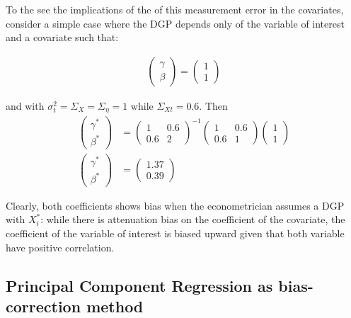 \documentclass[12pt]{article}
\begin{document}
To the see the implications of the of this measurement error in the covariates, consider a simple case where the DGP depends only of the variable of interest and a covariate such that:

\begin{align}
    \left(\begin{array}{l}
{\gamma} \\
{\beta}
\end{array}\right)=\left(\begin{array}{l}
1 \\
1
\end{array}\right)
\end{align}

and with $\sigma^2_t=\Sigma_X=\Sigma_\eta=1$ while $\Sigma_{Xt}=0.6$. Then
\begin{align*}
    \left(\begin{array}{l}
{\gamma}^* \\
{\beta}^*
\end{array}\right)& =\left(\begin{array}{cc}
1 & 0.6 \\
0.6 & 2
\end{array}\right)^{-1}\left(\begin{array}{cc}
1 & 0.6 \\
0.6 & 1
\end{array}\right)\left(\begin{array}{l}
1\\
1
\end{array}\right) \\
\left(\begin{array}{l}
{\gamma}^* \\
{\beta}^*
\end{array}\right)&=\left(\begin{array}{l}
1.37 \\
0.39
\end{array}\right)
\end{align*}

Clearly, both coefficients shows bias when the econometrician assumes a DGP with $X_i^*$: while there is attenuation bias on the coefficient of the covariate, the coefficient of the variable of interest is biased upward given that both variable have positive correlation.

\subsection{Principal Component Regression as bias-correction method}
\end{document}

